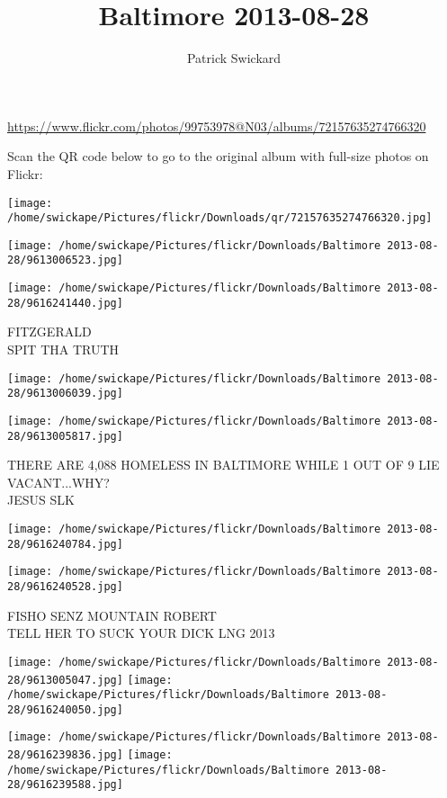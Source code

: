 \documentclass[10pt,letterpaper]{article}
\title{Baltimore 2013-08-28}
\author{Patrick Swickard}
\date{}
\begin{document}
\maketitle

\url{https://www.flickr.com/photos/99753978@N03/albums/72157635274766320}

Scan the QR code below to go to the original album with full-size photos on Flickr:

\texttt{[image: /home/swickape/Pictures/flickr/Downloads/qr/72157635274766320.jpg]}
\pagebreak

\texttt{[image: /home/swickape/Pictures/flickr/Downloads/Baltimore 2013-08-28/9613006523.jpg]}

\vspace{0.25in}
\texttt{[image: /home/swickape/Pictures/flickr/Downloads/Baltimore 2013-08-28/9616241440.jpg]}

FITZGERALD\\
SPIT THA TRUTH
\pagebreak

\texttt{[image: /home/swickape/Pictures/flickr/Downloads/Baltimore 2013-08-28/9613006039.jpg]}

\vspace{0.25in}
\texttt{[image: /home/swickape/Pictures/flickr/Downloads/Baltimore 2013-08-28/9613005817.jpg]}

THERE ARE 4,088 HOMELESS IN BALTIMORE WHILE 1 OUT OF 9 LIE VACANT...WHY?\\
JESUS SLK
\pagebreak

\texttt{[image: /home/swickape/Pictures/flickr/Downloads/Baltimore 2013-08-28/9616240784.jpg]}

\vspace{0.25in}
\texttt{[image: /home/swickape/Pictures/flickr/Downloads/Baltimore 2013-08-28/9616240528.jpg]}

FISHO SENZ MOUNTAIN ROBERT\\
TELL HER TO SUCK YOUR DICK LNG 2013
\pagebreak

\texttt{[image: /home/swickape/Pictures/flickr/Downloads/Baltimore 2013-08-28/9613005047.jpg]}
\texttt{[image: /home/swickape/Pictures/flickr/Downloads/Baltimore 2013-08-28/9616240050.jpg]}

\texttt{[image: /home/swickape/Pictures/flickr/Downloads/Baltimore 2013-08-28/9616239836.jpg]}
\texttt{[image: /home/swickape/Pictures/flickr/Downloads/Baltimore 2013-08-28/9616239588.jpg]}
\end{document}
